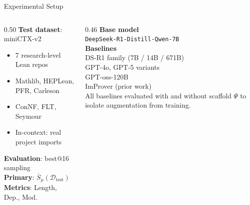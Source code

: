 \documentclass{beamer}
\begin{document}
\begin{frame}{Experimental Setup}
\vspace{0.4em}
\begin{columns}[T]
\begin{column}{0.50\textwidth}
\textbf{Test dataset}: miniCTX-v2\\[0.3em]
\begin{itemize}\setlength{\itemsep}{3pt}
  \item 7 research-level Lean repos
  \item Mathlib, HEPLean, PFR, Carleson
  \item ConNF, FLT, Seymour
  \item In-context: real project imports
\end{itemize}
\vspace{0.3em}
\textbf{Evaluation}: best@16 sampling\\
\textbf{Primary}: $\overline{S}_\mu(\mathcal{D}_{\mathrm{test}})$\\
\textbf{Metrics}: Length, Dep., Mod.
\end{column}
\begin{column}{0.46\textwidth}
\textbf{Base model}\\
\texttt{DeepSeek-R1-Distill-Qwen-7B}\\[0.4em]
\textbf{Baselines}\\
DS-R1 family (7B / 14B / 671B)\\
GPT-4o, GPT-5 variants\\
GPT-oss-120B\\
ImProver (prior work)\\[0.4em]
\small All baselines evaluated with and without scaffold $\Psi$ to isolate augmentation from training.
\end{column}
\end{columns}
\end{frame}
\end{document}
